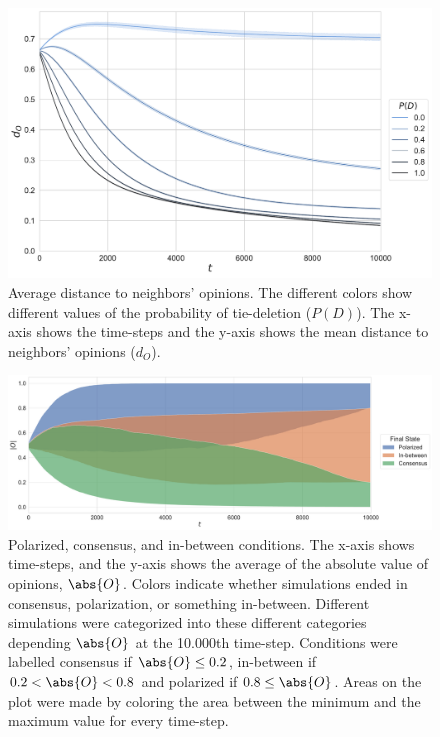 \documentclass[11pt]{article}
\DeclarePairedDelimiter{\abs}\lvert\rvert
\begin{document}
\begin{figure}[H]
    \centering
    \includegraphics[width=.7\linewidth]{../plots/overall/Distance_Tie_Deletion.pdf}
  \caption{Average distance to neighbors' opinions. The different colors show different values of the probability of tie-deletion ($P(D)$). The x-axis shows the time-steps and the y-axis shows the mean distance to neighbors' opinions ($d_O$). }
  \label{appendix:distance}
\end{figure}

\begin{figure}[H]
    \centering
    \includegraphics[width=.98\linewidth]{../plots/overall/Point_Of_No_Return.pdf}
  \caption{Polarized, consensus, and in-between conditions. The x-axis shows time-steps, and the y-axis shows the average of the absolute value of opinions, $\abs{O}$. Colors indicate whether simulations ended in consensus, polarization, or something in-between. Different simulations were categorized into these different categories depending $\abs{O}$ at the 10.000th time-step. Conditions were labelled consensus if $\abs{O} \leq 0.2$, in-between if $0.2 < \abs{O} < 0.8$ and polarized if $0.8 \leq \abs{O}$. Areas on the plot were made by coloring the area between the minimum and the maximum value for every time-step.}
  \label{appendix:ponr}
\end{figure}
\end{document}
